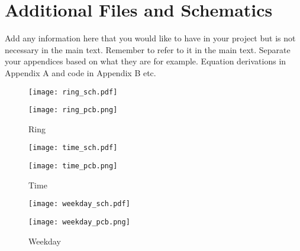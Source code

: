 \chapter{Additional Files and Schematics}

Add any information here that you would like to have in your project but is not necessary in the main
text. Remember to refer to it in the main text. Separate your appendices based on what they are for
example. Equation derivations in Appendix A and code in Appendix B etc.

\begin{figure}[h!]
\centering
\begin{minipage}[b]{1\textwidth}
\texttt{[image: ring\_sch.pdf]}
\label{fig:ring_sch}
\end{minipage}
\begin{minipage}[b]{1\textwidth}
\texttt{[image: ring\_pcb.png]}
\label{fig:ring_pcb}
\end{minipage}
\caption{Ring}
\label{fig:ring_sch_pcb}
\end{figure}


\begin{figure}[h!]
\centering
\begin{minipage}[b]{1\textwidth}
\texttt{[image: time\_sch.pdf]}
\label{fig:time_sch}
\end{minipage}
\begin{minipage}[b]{1\textwidth}
\texttt{[image: time\_pcb.png]}
\label{fig:time_pcb}
\end{minipage}
\caption{Time}
\label{fig:time_sch_pcb}
\end{figure}

\begin{figure}[h!]
\centering
\begin{minipage}[b]{1\textwidth}
\texttt{[image: weekday\_sch.pdf]}
\label{fig:weekday_sch}
\end{minipage}
\begin{minipage}[b]{1\textwidth}
\texttt{[image: weekday\_pcb.png]}
\label{fig:weekday_pcb}
\end{minipage}
\caption{Weekday}
\label{fig:weekday_sch_pcb}
\end{figure}

